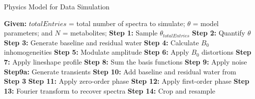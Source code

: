 \begin{algorithm}
\caption{Physics Model for Data Simulation}\label{alg:PM}
\begin{algorithmic}
  \State \textbf{Given:} $totalEntries$ = total number of spectra to simulate; $\theta$ = model parameters; and $N$ = metabolites;%
  \State \textbf{Step 1:} Sample $\theta_{totalEntries}$ 
  \State \textbf{Step 2:} Quantify $\theta$
  \State \textbf{Step 3:} Generate baseline and residual water
  \State \textbf{Step 4:} Calculate $B_0$ inhomogeneities
    \State \textbf{Step 5:} Modulate amplitude
    \State \textbf{Step 6:} Apply $B_0$ distortions
    \State \textbf{Step 7:} Apply lineshape profile
  \EndFor
  \State \textbf{Step 8:} Sum the basis functions
  \State \textbf{Step 9:} Apply noise 
      \State \textbf{Step9a:} Generate transients
    \EndIf
  \State \textbf{Step 10:} Add baseline and residual water from \textbf{Step 3} 
  \State \textbf{Step 11:} Apply zero-order phase
  \State \textbf{Step 12:} Apply first-order phase
  \State \textbf{Step 13:} Fourier transform to recover spectra
  \State \textbf{Step 14:} Crop and resample
\end{algorithmic}
\end{algorithm}


